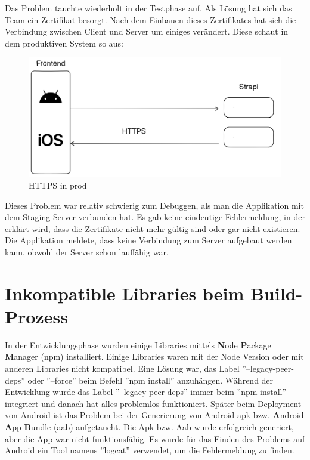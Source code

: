 Das Problem tauchte wiederholt in der Testphase auf. Als Lösung hat sich das Team ein Zertifikat besorgt. Nach dem Einbauen dieses Zertifikates hat sich die Verbindung zwischen Client und Server um einiges verändert. Diese schaut in dem produktiven System so aus:
\begin{figure}[H]
    \centering
    \includegraphics*[width=\textwidth]{./pics/https.png}
    \caption{HTTPS in prod}
\end{figure}

Dieses Problem war relativ schwierig zum Debuggen,
als man die Applikation mit dem Staging Server verbunden hat.
Es gab keine eindeutige Fehlermeldung, in der erklärt wird, dass die Zertifikate nicht mehr gültig sind oder gar nicht existieren.
Die Applikation meldete, dass keine Verbindung zum Server aufgebaut werden kann, obwohl der Server schon lauffähig war.





\section{Inkompatible Libraries beim Build-Prozess}\label{sec:inkompatible-libraries-beim-build-prozess}
In der Entwicklungsphase wurden einige Libraries mittels \textbf{N}ode  \textbf{P}ackage \textbf{M}anager (npm) installiert.
Einige Libraries waren mit der Node Version oder mit anderen Libraries nicht kompatibel.
Eine Lösung war, das Label ''--legacy-peer-deps'' oder ''--force'' beim Befehl ''npm install'' anzuhängen.
Während der Entwicklung wurde das Label ''--legacy-peer-deps'' immer beim ''npm install'' integriert
und danach hat alles problemlos funktioniert.
Später beim Deployment von Android ist das Problem
bei der Generierung von Android apk bzw.
\textbf{A}ndroid \textbf{A}pp \textbf{B}undle (aab) aufgetaucht.
Die Apk bzw.
Aab wurde erfolgreich generiert, aber die App war nicht funktionsfähig.
Es wurde für das Finden des Problems auf Android ein Tool namens ''logcat'' verwendet,
um die Fehlermeldung zu finden.

